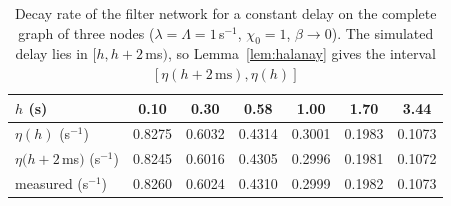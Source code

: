 \begin{table}[!t]
\caption{Decay rate of the filter network for a constant delay on the complete graph of three nodes ($\lambda=\Lambda=1$\,s$^{-1}$, $\chi_0=1$, $\beta\to0$). The simulated delay lies in $[h,h+2$\,ms$)$, so Lemma~\ref{lem:halanay} gives the interval $[\eta(h+2\,\mathrm{ms}),\eta(h)]$}\label{tab:rates}
\centering\footnotesize
\setlength{\tabcolsep}{3pt}
\begin{tabular}{@{}lcccccc@{}}\toprule
$h$ (s) & 0.10 & 0.30 & 0.58 & 1.00 & 1.70 & 3.44\\\midrule
$\eta(h)$ (s$^{-1}$) & 0.8275 & 0.6032 & 0.4314 & 0.3001 & 0.1983 & 0.1073\\
$\eta(h+2$\,ms$)$ (s$^{-1}$) & 0.8245 & 0.6016 & 0.4305 & 0.2996 & 0.1981 & 0.1072\\
measured (s$^{-1}$) & 0.8260 & 0.6024 & 0.4310 & 0.2999 & 0.1982 & 0.1073\\\bottomrule
\end{tabular}
\end{table}
